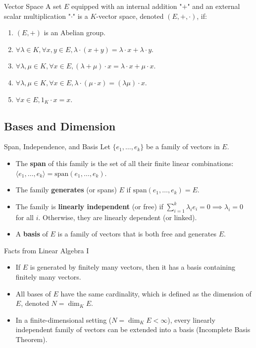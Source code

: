 \documentclass[11pt, a4paper]{article}
\begin{document}
\begin{definition}{Vector Space}{}
A set $E$ equipped with an internal addition "$+$" and an external scalar multiplication "$\cdot$" is a $K$-vector space, denoted $(E, +, \cdot)$, if:
\begin{enumerate}
    \item $(E, +)$ is an Abelian group. 
    \item $\forall \lambda \in K, \forall x, y \in E, \lambda \cdot (x + y) = \lambda \cdot x + \lambda \cdot y$. 
    \item $\forall \lambda, \mu \in K, \forall x \in E, (\lambda + \mu) \cdot x = \lambda \cdot x + \mu \cdot x$. 
    \item $\forall \lambda, \mu \in K, \forall x \in E, \lambda \cdot (\mu \cdot x) = (\lambda \mu) \cdot x$. 
    \item $\forall x \in E, 1_K \cdot x = x$. 
\end{enumerate}
\end{definition}

\subsection{Bases and Dimension}

\begin{definition}{Span, Independence, and Basis}{}
Let $\{e_1, \dots, e_k\}$ be a family of vectors in $E$. 
\begin{itemize}
    \item The \textbf{span} of this family is the set of all their finite linear combinations: $\langle e_1, \dots, e_k \rangle = \text{span}(e_1, \dots, e_k)$. 
    \item The family \textbf{generates} (or spans) $E$ if $\text{span}(e_1, \dots, e_k) = E$. 
    \item The family is \textbf{linearly independent} (or free) if $\sum_{i=1}^k \lambda_i e_i = 0 \implies \lambda_i = 0$ for all $i$. Otherwise, they are linearly dependent (or linked). 
    \item A \textbf{basis} of $E$ is a family of vectors that is both free and generates $E$. 
\end{itemize}
\end{definition}

\begin{remark}{Facts from Linear Algebra I}{}
\begin{itemize}
    \item If $E$ is generated by finitely many vectors, then it has a basis containing finitely many vectors. 
    \item All bases of $E$ have the same cardinality, which is defined as the dimension of $E$, denoted $N = \dim_K E$. 
    \item In a finite-dimensional setting ($N = \dim_K E < \infty$), every linearly independent family of vectors can be extended into a basis (Incomplete Basis Theorem). 
\end{itemize}
\end{remark}
\end{document}
